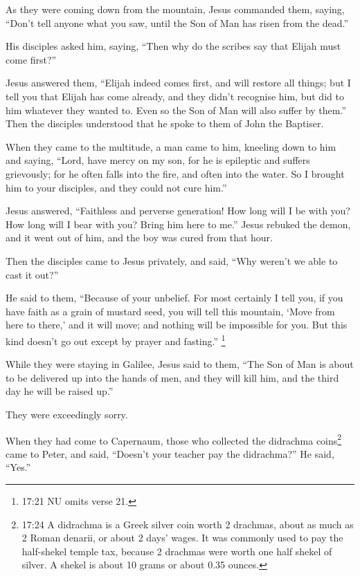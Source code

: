  As they were coming down from the mountain, Jesus commanded
them, saying, ``Don't tell anyone what you saw, until the Son of Man has
risen from the dead.''

 His disciples asked him, saying, ``Then why do the scribes
say that Elijah must come first?''

 Jesus answered them, ``Elijah indeed comes first, and will
restore all things;  but I tell you that Elijah has come
already, and they didn't recognise him, but did to him whatever they
wanted to. Even so the Son of Man will also suffer by them.''
 Then the disciples understood that he spoke to them of
John the Baptiser.

 When they came to the multitude, a man came to him,
kneeling down to him and saying,  ``Lord, have mercy on my
son, for he is epileptic and suffers grievously; for he often falls into
the fire, and often into the water.  So I brought him to
your disciples, and they could not cure him.''

 Jesus answered, ``Faithless and perverse generation! How
long will I be with you? How long will I bear with you? Bring him here
to me.''  Jesus rebuked the demon, and it went out of him,
and the boy was cured from that hour.

 Then the disciples came to Jesus privately, and said,
``Why weren't we able to cast it out?''

 He said to them, ``Because of your unbelief. For most
certainly I tell you, if you have faith as a grain of mustard seed, you
will tell this mountain, `Move from here to there,' and it will move;
and nothing will be impossible for you.  But this kind
doesn't go out except by prayer and fasting.'' \footnote{17:21 NU omits
  verse 21.}

 While they were staying in Galilee, Jesus said to them,
``The Son of Man is about to be delivered up into the hands of men,
 and they will kill him, and the third day he will be
raised up.''

They were exceedingly sorry.

 When they had come to Capernaum, those who collected the
didrachma coins\footnote{17:24 A didrachma is a Greek silver coin worth
  2 drachmas, about as much as 2 Roman denarii, or about 2 days' wages.
  It was commonly used to pay the half-shekel temple tax, because 2
  drachmas were worth one half shekel of silver. A shekel is about 10
  grams or about 0.35 ounces.} came to Peter, and said, ``Doesn't your
teacher pay the didrachma?''  He said, ``Yes.''

